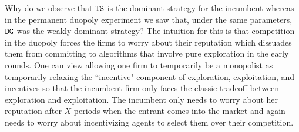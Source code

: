 \documentclass[../competing_bandits.tex]{subfiles}
\begin{document}

Why do we observe that $\mathtt{TS}$ is the dominant strategy for the incumbent whereas in the permanent duopoly experiment we saw that, under the same parameters, $\mathtt{DG}$ was the weakly dominant strategy? The intuition for this is that competition in the duopoly forces the firms to worry about their reputation which dissuades them from committing to algorithms that involve pure exploration in the early rounds. One can view allowing one firm to temporarily be a monopolist as temporarily relaxing the ``incentive" component of exploration, exploitation, and incentives so that the incumbent firm only faces the classic tradeoff between exploration and exploitation. The incumbent only needs to worry about her reputation after $X$ periods when the entrant comes into the market and again needs to worry about incentivizing agents to select them over their competition.
\end{document}

